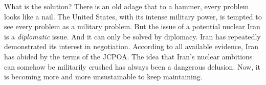 What is the solution? There is an old adage that to a hammer, every problem looks
like a nail. The United States, with its intense military power, is tempted
to see every problem as a military problem. But the issue of a potential
nuclear Iran is a {\em diplomatic} issue. And it can only be solved by diplomacy.
Iran has repeatedly demonstrated its interest in negotiation. According to all
available evidence, Iran has abided by the terms of the JCPOA. The idea that
Iran's nuclear ambitions can somehow be militarily crushed has always been a
dangerous delusion. Now, it is becoming more and more unsustainable to keep
maintaining.

\printbibliography


